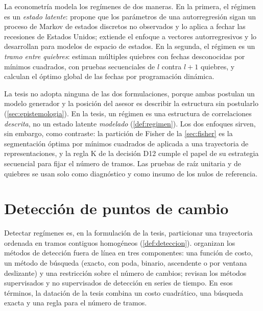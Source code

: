 La econometría modela los regímenes de dos maneras. En la primera, el régimen es un \emph{estado
latente}: \textcite{hamilton_1989} propone que los parámetros de una autorregresión sigan un
proceso de Markov de estados discretos no observados y lo aplica a fechar las recesiones de
Estados Unidos; \textcite{krolzig_1997} extiende el enfoque a vectores autorregresivos y
\textcite{kim_nelson_1999} lo
desarrollan para modelos de espacio de estados. En la segunda, el régimen es un \emph{tramo entre
quiebres}: \textcite{bai_perron_1998} estiman múltiples quiebres con fechas desconocidas por mínimos
cuadrados, con pruebas secuenciales de $l$ contra $l+1$ quiebres, y \textcite{bai_perron_2003}
calculan el óptimo global de las fechas por programación dinámica.

La tesis no adopta ninguna de las dos formulaciones, porque ambas postulan un modelo generador y la
posición del asesor es describir la estructura sin postularlo (\cref{sec:epistemologia}). En la
tesis, un régimen es una estructura de correlaciones \emph{descrita}, no un estado latente
\emph{modelado} (\cref{def:regimen}). Los dos enfoques sirven, sin embargo, como contraste: la
partición de Fisher de la \cref{sec:fisher} es la segmentación óptima por mínimos cuadrados de
\textcite{bai_perron_2003} aplicada a una trayectoria de representaciones, y la regla K de la
decisión D12 cumple el papel de su estrategia secuencial para fijar el número de tramos. Las
pruebas de raíz unitaria y de quiebres se usan solo como diagnóstico y como insumo de los nulos de
referencia.

\section{Detección de puntos de cambio}
\label{sec:ea-cambio}

Detectar regímenes es, en la formulación de la tesis, particionar una trayectoria ordenada en
tramos contiguos homogéneos (\cref{def:deteccion}). \textcite{truong_oudre_vayatis_2020} organizan
los métodos de detección fuera de línea en tres componentes: una función de costo, un método de
búsqueda (exacto, con poda, binario, ascendente o por ventana deslizante) y una restricción sobre
el número de cambios; \textcite{aminikhanghahi_cook_2017} revisan los métodos supervisados y no
supervisados de detección en series de tiempo. En esos términos, la datación de la tesis combina un costo cuadrático, una
búsqueda exacta y una regla para el número de tramos.

